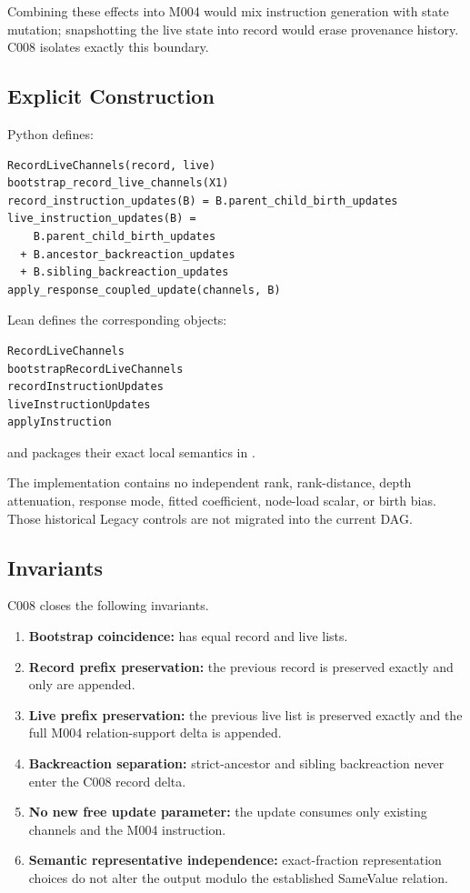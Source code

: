 Combining these effects into M004 would mix instruction generation with
state mutation; snapshotting the live state into record would erase
provenance history. C008 isolates exactly this boundary.

\subsection{Explicit Construction}\label{explicit-construction-10}

Python defines:

\begin{verbatim}
RecordLiveChannels(record, live)
bootstrap_record_live_channels(X1)
record_instruction_updates(B) = B.parent_child_birth_updates
live_instruction_updates(B) =
    B.parent_child_birth_updates
  + B.ancestor_backreaction_updates
  + B.sibling_backreaction_updates
apply_response_coupled_update(channels, B)
\end{verbatim}

Lean defines the corresponding objects:

\begin{verbatim}
RecordLiveChannels
bootstrapRecordLiveChannels
recordInstructionUpdates
liveInstructionUpdates
applyInstruction
\end{verbatim}

and packages their exact local semantics in
\texttt{\protect{}}.

The implementation contains no independent rank, rank-distance, depth
attenuation, response mode, fitted coefficient, node-load scalar, or
birth bias. Those historical Legacy controls are not migrated into the
current DAG.

\subsection{Invariants}\label{invariants-10}

C008 closes the following invariants.

\begin{enumerate}
\def\labelenumi{\arabic{enumi}.}
\tightlist
\item
  \textbf{Bootstrap coincidence:}
  \texttt{\protect{}} has equal record and live
  lists.
\item
  \textbf{Record prefix preservation:} the previous record is preserved
  exactly and only \texttt{\protect{}} are appended.
\item
  \textbf{Live prefix preservation:} the previous live list is preserved
  exactly and the full M004 relation-support delta is appended.
\item
  \textbf{Backreaction separation:} strict-ancestor and sibling
  backreaction never enter the C008 record delta.
\item
  \textbf{No new free update parameter:} the update consumes only
  existing channels and the M004 instruction.
\item
  \textbf{Semantic representative independence:} exact-fraction
  representation choices do not alter the output modulo the established
  SameValue relation.
\end{enumerate}


